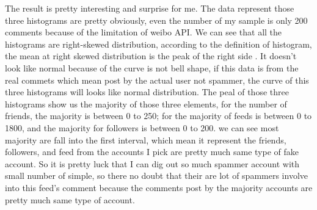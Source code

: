 \documentclass[sigconf]{acmart}
\begin{document}
The result is pretty interesting and surprise for me. The data represent those three histograms are pretty obviously, even the number of my sample is only 200 comments because of the limitation of weibo API. We can see that all the histograms are right-skewed distribution, according to the definition of histogram, the mean at right skewed distribution is the peak of the right side \cite{method:10}. It doesn't look like normal because of the curve is not bell shape, if this data is from the real commets which mean post by the actual user not spammer, the curve of this three histograms will looks like normal distribution. The peal of those three histograms show us the majority of those three elements, for the number of friends, the majority is between 0 to 250; for the majority of feeds is between 0 to 1800, and the majority for followers is between 0 to 200. we can see most majority are fall into the first interval, which mean it represent the friends, followers, and feed from the accounts I pick are pretty much same type of fake account. So it is pretty luck that I can dig out so much spammer account with small number of simple, so there no doubt that their are lot of spammers involve into this feed's comment because the comments post by the majority accounts are pretty much same type of account.
\end{document}
